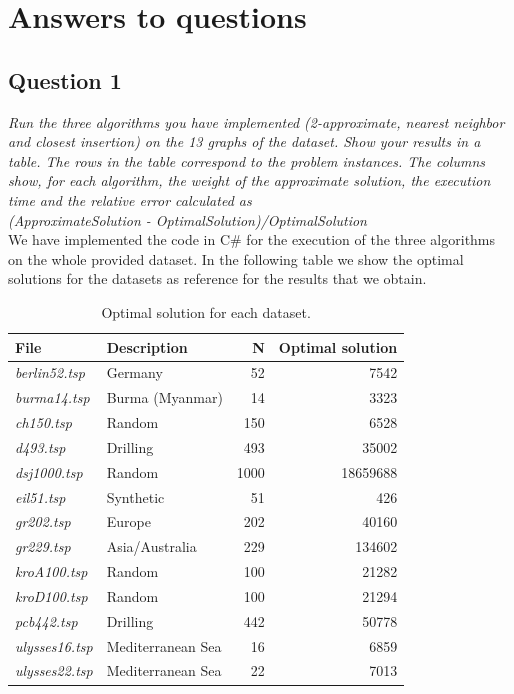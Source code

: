 \section{Answers to questions}

\subsection{Question 1}
\textit{Run the three algorithms you have implemented (2-approximate, nearest neighbor and closest insertion) on the 13 graphs of the dataset. Show your results in a table. The rows in the table correspond to the problem instances. The columns show, for each algorithm, the weight of the approximate solution, the execution time and the relative error calculated as\\(ApproximateSolution - OptimalSolution)/OptimalSolution} \\

\noindent
We have implemented the code in C\# for the execution of the three algorithms on the whole provided dataset.
In the following table we show the optimal solutions for the datasets as reference for the results that we obtain.
\begin{table}[H]\centering
    \begin{tabular}{|l|l|r|r|}
    \hline
    \textbf{File} & \textbf{Description} & \textbf{N} & \textbf{Optimal solution} \\
    \hline
    \textit{berlin52.tsp}	    & Germany	        & 52 	& 7542 \\
    \textit{burma14.tsp}	    & Burma (Myanmar)	& 14	& 3323 \\
    \textit{ch150.tsp}	        & Random	        & 150	& 6528 \\
    \textit{d493.tsp}	        & Drilling	        & 493	& 35002 \\
    \textit{dsj1000.tsp}	    & Random	        & 1000 	& 18659688 \\
    \textit{eil51.tsp}          & Synthetic	        & 51	& 426 \\
    \textit{gr202.tsp}	        & Europe	        & 202   & 40160 \\
    \textit{gr229.tsp}	        & Asia/Australia	& 229	& 134602 \\
    \textit{kroA100.tsp}	    & Random 	        & 100	& 21282 \\
    \textit{kroD100.tsp}	    & Random	        & 100	& 21294 \\
    \textit{pcb442.tsp}         & Drilling		    & 442 	& 50778 \\
    \textit{ulysses16.tsp}      & Mediterranean Sea & 16	& 6859 \\
    \textit{ulysses22.tsp}      & Mediterranean Sea & 22	& 7013 \\
    \hline
    \end{tabular}
    \caption{Optimal solution for each dataset.}
\end{table}

